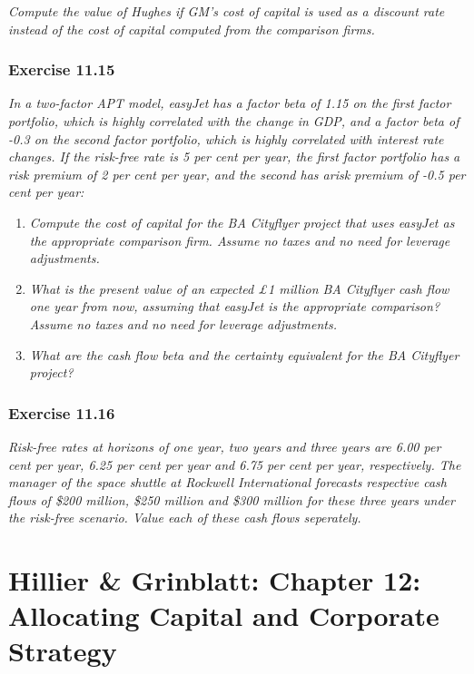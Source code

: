 \documentclass[]{book}
\theoremstyle{definition}
\theoremstyle{definition}
\theoremstyle{remark}
\begin{document}
\emph{Compute the value of Hughes if GM's cost of capital is used as a
discount rate instead of the cost of capital computed from the
comparison firms.} \citep[p.390]{book}

\subsection{Exercise 11.15}\label{exercise-11.15}

\emph{In a two-factor APT model, easyJet has a factor beta of 1.15 on
the first factor portfolio, which is highly correlated with the change
in GDP, and a factor beta of -0.3 on the second factor portfolio, which
is highly correlated with interest rate changes. If the risk-free rate
is 5 per cent per year, the first factor portfolio has a risk premium of
2 per cent per year, and the second has arisk premium of -0.5 per cent
per year:} \citep[p.390]{book}

\begin{enumerate}
\def\labelenumi{\alph{enumi}.}
\item
  \emph{Compute the cost of capital for the BA Cityflyer project that
  uses easyJet as the appropriate comparison firm. Assume no taxes and
  no need for leverage adjustments.} \citep[p.390]{book}
\item
  \emph{What is the present value of an expected £1 million BA Cityflyer
  cash flow one year from now, assuming that easyJet is the appropriate
  comparison? Assume no taxes and no need for leverage adjustments.}
  \citep[p.390]{book}
\item
  \emph{What are the cash flow beta and the certainty equivalent for the
  BA Cityflyer project?} \citep[p.390]{book}
\end{enumerate}

\subsection{Exercise 11.16}\label{exercise-11.16}

\emph{Risk-free rates at horizons of one year, two years and three years
are 6.00 per cent per year, 6.25 per cent per year and 6.75 per cent per
year, respectively. The manager of the space shuttle at Rockwell
International forecasts respective cash flows of \$200 million, \$250
million and \$300 million for these three years under the risk-free
scenario. Value each of these cash flows seperately.}
\citep[p.390]{book}

\chapter{Hillier \& Grinblatt: Chapter 12: Allocating Capital and
Corporate
Strategy}\label{hillier-grinblatt-chapter-12-allocating-capital-and-corporate-strategy}
\end{document}
